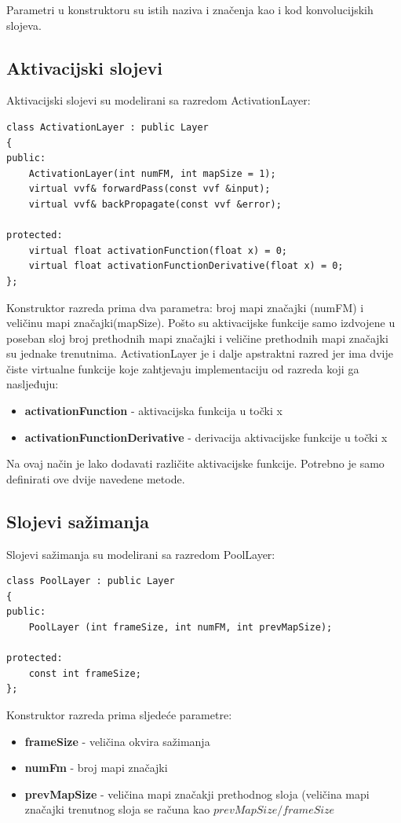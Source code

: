 \documentclass[times, utf8, zavrsni, numeric]{fer}
\begin{document}
Parametri u konstruktoru su istih naziva i značenja kao i kod konvolucijskih slojeva.

\subsection{Aktivacijski slojevi}
Aktivacijski slojevi su modelirani sa razredom ActivationLayer:
\begin{lstlisting}[caption=Razred ActivationLayer,
  label=ActivationLayer]
class ActivationLayer : public Layer
{
public:
    ActivationLayer(int numFM, int mapSize = 1);
    virtual vvf& forwardPass(const vvf &input);
    virtual vvf& backPropagate(const vvf &error);

protected:
    virtual float activationFunction(float x) = 0;
    virtual float activationFunctionDerivative(float x) = 0;
};
\end{lstlisting}

Konstruktor razreda prima dva parametra: broj mapi značajki (numFM) i veličinu mapi značajki(mapSize). Pošto su aktivacijske funkcije samo izdvojene u poseban sloj broj prethodnih mapi značajki i veličine prethodnih mapi značajki su jednake trenutnima. ActivationLayer je i dalje apstraktni razred jer ima dvije čiste virtualne funkcije koje zahtjevaju implementaciju od razreda koji ga nasljeđuju:
\begin{itemize}
\item \textbf{activationFunction} - aktivacijska funkcija u točki x
\item \textbf{activationFunctionDerivative} - derivacija aktivacijske funkcije u točki x
\end{itemize}
Na ovaj način je lako dodavati različite aktivacijske funkcije. Potrebno je samo definirati ove dvije navedene metode.


\subsection{Slojevi sažimanja}
Slojevi sažimanja su modelirani sa razredom PoolLayer:
\begin{lstlisting}[caption=Razred PoolLayer,
  label=PoolLayer]
class PoolLayer : public Layer
{
public:
    PoolLayer (int frameSize, int numFM, int prevMapSize); 

protected:
    const int frameSize;
};
\end{lstlisting}

Konstruktor razreda prima sljedeće parametre:
\begin{itemize}
\item \textbf{frameSize} - veličina okvira sažimanja
\item \textbf{numFm} - broj mapi značajki
\item \textbf{prevMapSize} - veličina mapi značakji prethodnog sloja (veličina mapi značajki trenutnog sloja se računa kao $prevMapSize/frameSize$
\end{itemize}
\end{document}
